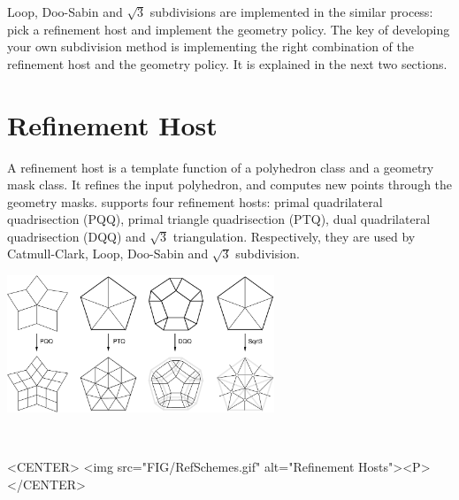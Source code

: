 
Loop, Doo-Sabin and $\sqrt{3}$ subdivisions are implemented 
in the similar process: pick a refinement host and implement 
the geometry policy. The key of developing your own 
subdivision method is implementing the right combination of 
the refinement host and the geometry policy. It is 
explained in the next two sections.

\section{Refinement Host}
\label{secRefHost}
A refinement host is a template function of 
a polyhedron class and a geometry mask class. It refines
the input polyhedron, and computes new points through the geometry masks.
 supports four refinement hosts:
primal quadrilateral quadrisection (PQQ), 
primal triangle quadrisection (PTQ), dual quadrilateral 
quadrisection (DQQ) and $\sqrt{3}$ triangulation.
Respectively, they are used by Catmull-Clark, Loop, Doo-Sabin 
and $\sqrt{3}$ subdivision. 

\begin{ccTexOnly}
  \begin{center}
    \parbox{0.6\textwidth}{%
      \includegraphics[width=0.6\textwidth]{Subdivision_method_3/FIG/RefSchemes}%
    }\\ \vspace{0.5cm}
  \end{center}
\end{ccTexOnly}

\begin{ccHtmlOnly}
  <CENTER>
     <img src="FIG/RefSchemes.gif" alt="Refinement Hosts"><P>
  </CENTER>
\end{ccHtmlOnly}


